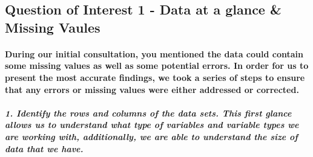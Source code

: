 \documentclass[
]{article}
\begin{document}
\hypertarget{question-of-interest-1---data-at-a-glance-missing-vaules}{%
\subsection{Question of Interest 1 - Data at a glance \& Missing
Vaules}\label{question-of-interest-1---data-at-a-glance-missing-vaules}}

\hypertarget{during-our-initial-consultation-you-mentioned-the-data-could-contain-some-missing-values-as-well-as-some-potential-errors.-in-order-for-us-to-present-the-most-accurate-findings-we-took-a-series-of-steps-to-ensure-that-any-errors-or-missing-values-were-either-addressed-or-corrected.}{%
\paragraph{During our initial consultation, you mentioned the data could
contain some missing values as well as some potential errors. In order
for us to present the most accurate findings, we took a series of steps
to ensure that any errors or missing values were either addressed or
corrected.}\label{during-our-initial-consultation-you-mentioned-the-data-could-contain-some-missing-values-as-well-as-some-potential-errors.-in-order-for-us-to-present-the-most-accurate-findings-we-took-a-series-of-steps-to-ensure-that-any-errors-or-missing-values-were-either-addressed-or-corrected.}}

\hypertarget{identify-the-rows-and-columns-of-the-data-sets.-this-first-glance-allows-us-to-understand-what-type-of-variables-and-variable-types-we-are-working-with-additionally-we-are-able-to-understand-the-size-of-data-that-we-have.}{%
\subparagraph{1. Identify the rows and columns of the data sets. This
first glance allows us to understand what type of variables and variable
types we are working with, additionally, we are able to understand the
size of data that we
have.}\label{identify-the-rows-and-columns-of-the-data-sets.-this-first-glance-allows-us-to-understand-what-type-of-variables-and-variable-types-we-are-working-with-additionally-we-are-able-to-understand-the-size-of-data-that-we-have.}}
\end{document}
